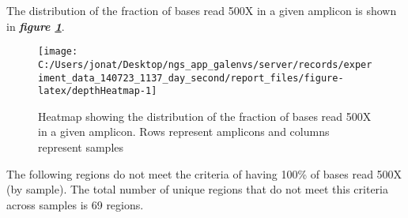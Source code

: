 \documentclass[
]{article}
\begin{document}
The distribution of the fraction of bases read 500X in a given amplicon is shown in \textbf{\emph{figure \ref{fig:depthHeatmap}}}.

\begin{figure}
\texttt{[image: C:/Users/jonat/Desktop/ngs\_app\_galenvs/server/records/experiment\_data\_140723\_1137\_day\_second/report\_files/figure-latex/depthHeatmap-1]} \caption[Depth 500X Heatmap]{Heatmap showing the distribution of the fraction of bases read 500X in a given amplicon. Rows represent amplicons and columns represent samples}\label{fig:depthHeatmap}
\end{figure}

The following regions do not meet the criteria of having 100\% of bases read 500X (by sample). The total number of unique regions that do not meet this criteria across samples is 69 regions.
\end{document}
